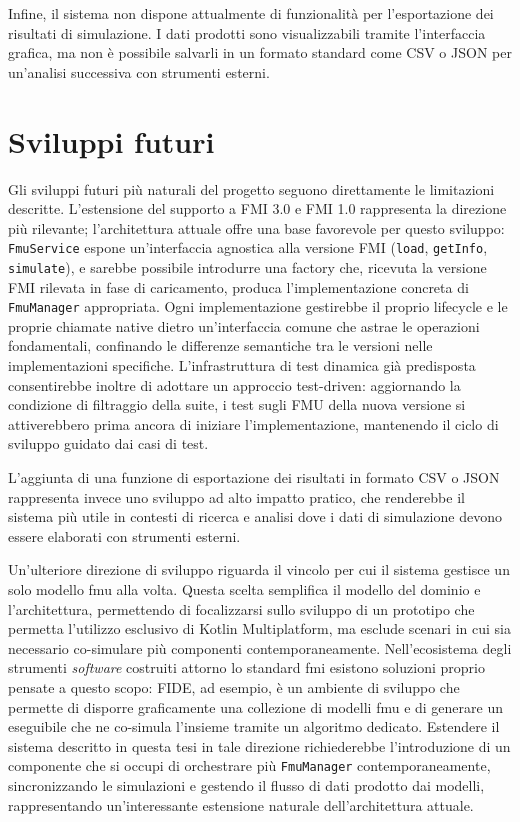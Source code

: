Infine, il sistema non dispone attualmente di funzionalità per l'esportazione dei risultati di simulazione. I dati prodotti sono visualizzabili tramite l'interfaccia grafica, ma non è possibile salvarli in un formato standard come CSV o JSON per un'analisi successiva con strumenti esterni.

\section{Sviluppi futuri}
\label{sec:conclusioni-futuro}

Gli sviluppi futuri più naturali del progetto seguono direttamente le limitazioni descritte. L'estensione del supporto a FMI 3.0 e FMI 1.0 rappresenta la direzione più rilevante; l'architettura attuale offre una base favorevole per questo sviluppo: \texttt{FmuService} espone un'interfaccia agnostica alla versione FMI (\texttt{load}, \texttt{getInfo}, \texttt{simulate}), e sarebbe possibile introdurre una factory che, ricevuta la versione FMI rilevata in fase di caricamento, produca l'implementazione concreta di \texttt{FmuManager} appropriata. Ogni implementazione gestirebbe il proprio lifecycle e le proprie chiamate native dietro un'interfaccia comune che astrae le operazioni fondamentali, confinando le differenze semantiche tra le versioni nelle implementazioni specifiche. L'infrastruttura di test dinamica già predisposta consentirebbe inoltre di adottare un approccio test-driven: aggiornando la condizione di filtraggio della suite, i test sugli FMU della nuova versione si attiverebbero prima ancora di iniziare l'implementazione, mantenendo il ciclo di sviluppo guidato dai casi di test.

L'aggiunta di una funzione di esportazione dei risultati in formato CSV o JSON rappresenta invece uno sviluppo ad alto impatto pratico, che renderebbe il sistema più utile in contesti di ricerca e analisi dove i dati di simulazione devono essere elaborati con strumenti esterni.

Un'ulteriore direzione di sviluppo riguarda il vincolo per cui il sistema gestisce un solo modello \ac{fmu} alla volta. Questa scelta semplifica il modello del dominio e l'architettura, permettendo di focalizzarsi sullo sviluppo di un prototipo che permetta l'utilizzo esclusivo di Kotlin Multiplatform, ma esclude scenari in cui sia necessario co-simulare più componenti contemporaneamente. Nell'ecosistema degli strumenti \textit{software} costruiti attorno lo standard \ac{fmi} esistono soluzioni proprio pensate a questo scopo: FIDE\cite{DBLP:conf/sac/CremonaLTBL16}, ad esempio, è un ambiente di sviluppo che permette di disporre graficamente una collezione di modelli \ac{fmu} e di generare un eseguibile che ne co-simula l'insieme tramite un algoritmo dedicato. Estendere il sistema descritto in questa tesi in tale direzione richiederebbe l'introduzione di un componente che si occupi di orchestrare più \texttt{FmuManager} contemporaneamente, sincronizzando le simulazioni e gestendo il flusso di dati prodotto dai modelli, rappresentando un'interessante estensione naturale dell'architettura attuale.


